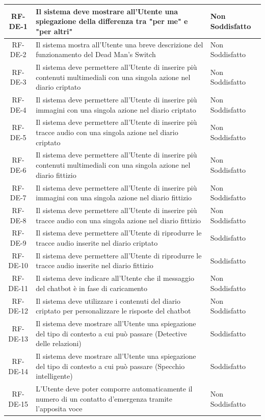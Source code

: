 \documentclass[a4paper,12pt]{article}
\begin{document}
\begin{center}
\begin{longtable}{|c|p{8.5cm}|>{\centering\arraybackslash}p{4cm}|}
\rowcolor{white}
RF-DE-1 & Il sistema deve mostrare all'Utente una spiegazione della differenza tra "per me" e "per altri" & Non Soddisfatto \\
\hline
\rowcolor{gray!20}
RF-DE-2 & Il sistema mostra all'Utente una breve descrizione del funzionamento del Dead Man's Switch & Non Soddisfatto \\
\hline
\rowcolor{white}
RF-DE-3 & Il sistema deve permettere all'Utente di inserire più contenuti multimediali con una singola azione nel diario criptato & Non Soddisfatto \\
\hline
\rowcolor{gray!20}
RF-DE-4 & Il sistema deve permettere all'Utente di inserire più immagini con una singola azione nel diario criptato & Non Soddisfatto \\
\hline
\rowcolor{white}
RF-DE-5 & Il sistema deve permettere all'Utente di inserire più tracce audio con una singola azione nel diario criptato & Non Soddisfatto \\
\hline
\rowcolor{gray!20}
RF-DE-6 & Il sistema deve permettere all'Utente di inserire più contenuti multimediali con una singola azione nel diario fittizio & Non Soddisfatto \\
\hline
\rowcolor{white}
RF-DE-7 & Il sistema deve permettere all'Utente di inserire più immagini con una singola azione nel diario fittizio & Non Soddisfatto \\
\hline
\rowcolor{gray!20}
RF-DE-8 & Il sistema deve permettere all'Utente di inserire più tracce audio con una singola azione nel diario fittizio & Non Soddisfatto \\
\hline
\rowcolor{white}
RF-DE-9 & Il sistema deve permettere all'Utente di riprodurre le tracce audio inserite nel diario criptato & Soddisfatto \\
\hline
\rowcolor{gray!20}
RF-DE-10 & Il sistema deve permettere all'Utente di riprodurre le tracce audio inserite nel diario fittizio & Soddisfatto \\
\hline
\rowcolor{white}
RF-DE-11 & Il sistema deve indicare all'Utente che il messaggio del chatbot è in fase di caricamento & Non Soddisfatto \\
\hline
\rowcolor{gray!20}
RF-DE-12 & Il sistema deve utilizzare i contenuti del diario criptato per personalizzare le risposte del chatbot & Non Soddisfatto \\
\hline
\rowcolor{white}
RF-DE-13 & Il sistema deve mostrare all'Utente una spiegazione del tipo di contesto a cui può passare (Detective delle relazioni) & Soddisfatto \\
\hline
\rowcolor{gray!20}
RF-DE-14 & Il sistema deve mostrare all'Utente una spiegazione del tipo di contesto a cui può passare (Specchio intelligente) & Soddisfatto \\
\hline
\rowcolor{white}
RF-DE-15 & L'Utente deve poter comporre automaticamente il numero di un contatto d'emergenza tramite l'apposita voce & Non Soddisfatto \\
\hline


\end{longtable}
\end{center}
\end{document}
